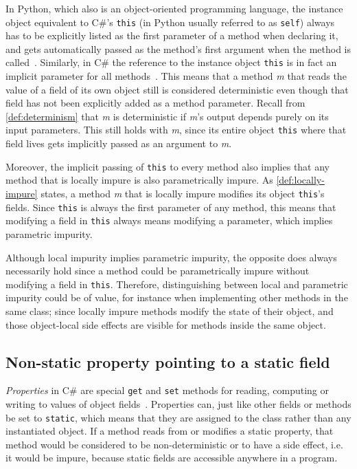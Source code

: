 \documentclass[a4paper,12pt]{article}
\begin{document}
In Python, which also is an object-oriented programming language, the instance object equivalent to C\#'s \texttt{this} (in Python usually referred to as \texttt{self}) always has to be explicitly listed as the first parameter of a method when declaring it, and gets automatically passed as the method's first argument when the method is called~\cite{python-classes}. Similarly, in C\# the reference to the instance object \texttt{this} is in fact an implicit parameter for all methods~\cite{michaelis2018essential}. This means that a method \textit{m} that reads the value of a field of its own object still is considered deterministic even though that field has not been explicitly added as a method parameter. Recall from \autoref{def:determinism} that \textit{m} is deterministic if \textit{m}'s output depends purely on its input parameters. This still holds with \textit{m}, since its entire object \texttt{this} where that field lives gets implicitly passed as an argument to \textit{m}.

Moreover, the implicit passing of \texttt{this} to every method also implies that any method that is locally impure is also parametrically impure. As \autoref{def:locally-impure} states, a method \textit{m} that is locally impure modifies its object \texttt{this}'s fields. Since \texttt{this} is always the first parameter of any method, this means that modifying a field in \texttt{this} always means modifying a parameter, which implies parametric impurity.

Although local impurity implies parametric impurity, the opposite does always necessarily hold since a method could be parametrically impure without modifying a field in \texttt{this}. Therefore, distinguishing between local and parametric impurity could be of value, for instance when implementing other methods in the same class; since locally impure methods modify the state of their object, and those object-local side effects are visible for methods inside the same object.

\subsection{Non-static property pointing to a static field} \label{sub:non-static-property}

\textit{Properties} in C\# are special \texttt{get} and \texttt{set} methods for reading, computing or writing to values of object fields~\cite{microsoft-properties}. Properties can, just like other fields or methods be set to \texttt{static}, which means that they are assigned to the class rather than any instantiated object. If a method reads from or modifies a static property, that method would be considered to be non-deterministic or to have a side effect, i.e. it would be impure, because static fields are accessible anywhere in a program.
\end{document}
